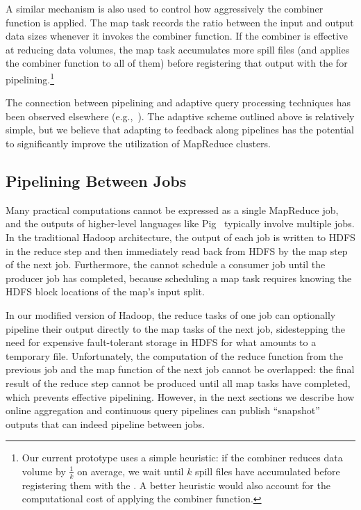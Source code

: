 A similar mechanism is also used to control how aggressively the combiner
function is applied. The map task records the ratio between the input and output
data sizes whenever it invokes the combiner function. If the combiner is
effective at reducing data volumes, the map task accumulates more spill files
(and applies the combiner function to all of them) before registering that
output with the {\TT} for pipelining.\footnote{Our current prototype uses a
  simple heuristic: if the combiner reduces data volume by $\frac{1}{k}$ on
  average, we wait until $k$ spill files have accumulated before registering
  them with the {\TT}. A better heuristic would also account for the computational
  cost of applying the combiner function.}

The connection between pipelining and adaptive query processing techniques has
been observed elsewhere (e.g.,~\cite{eddies}). The adaptive scheme outlined
above is relatively simple, but we believe that adapting to feedback along
pipelines has the potential to significantly improve the utilization of
MapReduce clusters.

\subsection{Pipelining Between Jobs}
\label{sec:inter-pipe}

Many practical computations cannot be expressed as a single MapReduce job, and
the outputs of higher-level languages like Pig~\cite{pig} typically involve
multiple jobs.  In the traditional Hadoop architecture, the output of each job
is written to HDFS in the reduce step and then immediately read back from HDFS
by the map step of the next job. Furthermore, the {\JT} cannot schedule a
consumer job until the producer job has completed, because scheduling a map task
requires knowing the HDFS block locations of the map's input split.

In our modified version of Hadoop, the reduce tasks of one job can optionally
pipeline their output directly to the map tasks of the next job, sidestepping
the need for expensive fault-tolerant storage in HDFS for what amounts to a
temporary file. Unfortunately, the computation of the reduce function from the
previous job and the map function of the next job cannot be overlapped: the
final result of the reduce step cannot be produced until all map tasks have
completed, which prevents effective pipelining. However, in the next sections we
describe how online aggregation and continuous query pipelines can publish
``snapshot'' outputs that can indeed pipeline between jobs.

